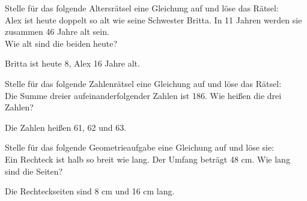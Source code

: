 \documentclass[addpoints,a4paper,ngerman,12pt]{exam}
\newcommand{\lsgend}{\end{solutionorgrid}}
\newcommand{\lsg}[1][1]{\begin{solutionorgrid}[\stretch{#1}]}
\newcommand{\seitenwechsel}{\ifthenelse{\equal{\mitlsg}{ja}}{}{\newpage}}
\begin{document}
\begin{questions}
\seitenwechsel
\question[5] Stelle für das folgende Altersrätsel eine Gleichung auf und löse das Rätsel:\\
Alex ist heute doppelt so alt wie seine Schwester Britta. In 11 Jahren werden sie zusammen 46 Jahre alt sein.\\
Wie alt sind die beiden heute?
	\lsg[1]
Britta ist heute 8, Alex 16 Jahre alt.
\lsgend

\question[5] Stelle für das folgende Zahlenrätsel eine Gleichung auf und löse das Rätsel:\\
Die Summe dreier aufeinanderfolgender Zahlen ist 186. Wie heißen die drei Zahlen?
\lsg[1]
Die Zahlen heißen 61, 62 und 63.
\lsgend
\seitenwechsel
\question[5] Stelle für das folgende Geometrieaufgabe eine Gleichung auf und löse sie:\\
Ein Rechteck ist halb so breit wie lang. Der Umfang beträgt 48 cm. Wie lang sind die Seiten?
\lsg[1]
Die Rechteckseiten sind 8 cm und 16 cm lang.
\lsgend
		
\end{questions}
\label{lastpage}
\end{document}
